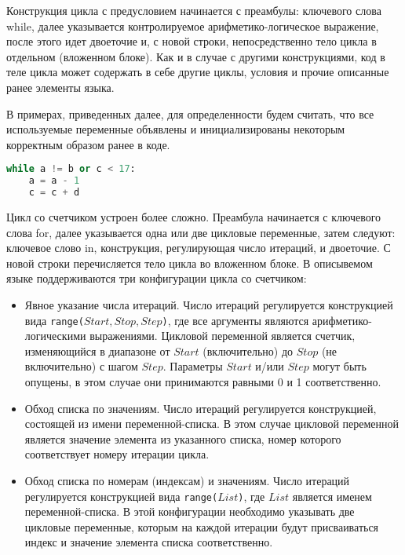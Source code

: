 Конструкция цикла с предусловием начинается с преамбулы: ключевого слова while, далее указывается контролируемое арифметико-логическое выражение, после этого идет двоеточие и, с новой строки, непосредственно тело цикла в отдельном (вложенном блоке).
Как и в случае с другими конструкциями, код в теле цикла может содержать в себе другие циклы, условия и прочие описанные ранее элементы языка.

В примерах, приведенных далее, для определенности будем считать, что все используемые переменные объявлены и инициализированы некоторым корректным образом ранее в коде.

\begin{lstlisting}[language=Python, caption=Пример цикла с предусловием]
while a != b or c < 17:
    a = a - 1
    c = c + d
\end{lstlisting}

Цикл со счетчиком устроен более сложно.
Преамбула начинается с ключевого слова for, далее указывается одна или две цикловые переменные, затем следуют: ключевое слово in, конструкция, регулирующая число итераций, и двоеточие.
С новой строки перечисляется тело цикла во вложенном блоке.
В описывемом языке поддерживаются три конфигурации цикла со счетчиком:

\begin{itemize}
    \item Явное указание числа итераций. Число итераций регулируется конструкцией вида \verb|range(|\(Start, Stop, Step\)\verb|)|, где все аргументы являются арифметико-логическими выражениями. Цикловой переменной является счетчик, изменяющийся в диапазоне от \(Start\) (включительно) до \(Stop\) (не включительно) с шагом \(Step\). Параметры \(Start\) и/или \(Step\) могут быть опущены, в этом случае они принимаются равными 0 и 1 соответственно.
    \item Обход списка по значениям. Число итераций регулируется конструкцией, состоящей из имени переменной-списка. В этом случае цикловой переменной является значение элемента из указанного списка, номер которого соответствует номеру итерации цикла.
    \item Обход списка по номерам (индексам) и значениям. Число итераций регулируется конструкцией вида \verb|range(|\(List\)\verb|)|, где \(List\) является именем переменной-списка. В этой конфигурации необходимо указывать две цикловые переменные, которым на каждой итерации будут присваиваться индекс и значение элемента списка соответственно.
\end{itemize}


